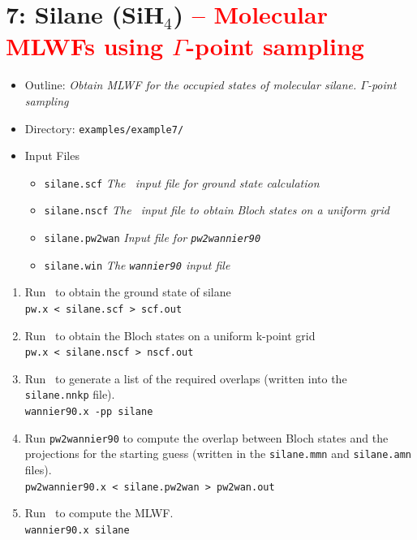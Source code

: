\documentclass[a4paper,11pt,twoside]{article}
\def\tent#1{\textcolor{red}{#1}}     %
\begin{document}

\cleardoublepage

\section*{7: Silane  (SiH$_4$) \tent{-- Molecular MLWFs using 
$\Gamma$-point sampling}}
\begin{itemize}
\item{Outline: \it{Obtain MLWF for the occupied states of molecular
    silane. $\Gamma$-point sampling}} 
\item{Directory: {\tt examples/example7/}}
\item{Input Files}
\begin{itemize}
\item{ {\tt silane.scf}  {\it The \pwscf\ input file for ground state
    calculation}} 
\item{ {\tt silane.nscf}  {\it The \pwscf\ input file to obtain Bloch states
    on a uniform grid}} 
\item{ {\tt silane.pw2wan}  {\it Input file for {\tt pw2wannier90}}}
\item{ {\tt silane.win}  {\it The {\tt wannier90} input file}}
\end{itemize}
\end{itemize}

\begin{enumerate}
\item Run \pwscf\ to obtain the ground state of silane\\
{\tt pw.x < silane.scf > scf.out}

\item Run \pwscf\ to obtain the Bloch states on a uniform k-point grid\\
{\tt pw.x < silane.nscf > nscf.out}

\item Run \wannier\ to generate a list of the required overlaps (written
  into the {\tt silane.nnkp} file).\\ 
{\tt wannier90.x -pp silane}

\item Run {\tt pw2wannier90} to compute the overlap between Bloch
  states and the projections for the starting guess (written in the
  {\tt silane.mmn} and {\tt silane.amn} files).\\  
{\tt pw2wannier90.x < silane.pw2wan > pw2wan.out}

\item Run \wannier\ to compute the MLWF.\\
{\tt wannier90.x silane}
\end{enumerate}
\end{document}
